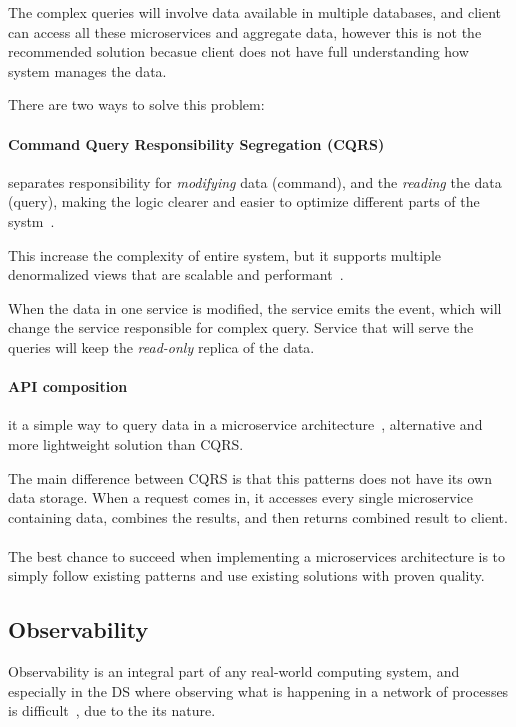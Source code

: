The complex queries will involve data available in multiple databases, and client can access all these microservices and aggregate data, however this is not the recommended solution becasue client does not have full understanding how system manages the data.

There are two ways to solve this problem:
\paragraph{Command Query Responsibility Segregation (CQRS)}\label{par:cqrs}
%
separates responsibility for \emph{modifying} data (command), and the \emph{reading} the data (query), making the logic clearer and easier to optimize different parts of the systm~\cite{richardson2018microservices, 8101372}.

This increase the complexity of entire system, but it supports multiple denormalized views that are scalable and performant~\cite{richardson2018microservices}.

When the data in one service is modified, the service emits the event, which will change the service responsible for complex query. Service that will serve the queries will keep the \emph{read-only} replica of the data.
%
%
\paragraph{API composition}\label{par:composition}
%
%
it a simple way to query data in a microservice architecture~\cite{richardson2018microservices, 8890660}, alternative and more lightweight solution than CQRS. 

The main difference between CQRS is that this patterns does not have its own data storage. When a request comes in, it accesses every single microservice containing data, combines the results, and then returns combined result to client.\\\\
%
The best chance to succeed when implementing a microservices architecture is to simply follow existing patterns and use existing solutions with proven quality.
%
%
\subsection{Observability}\label{sec:log_aggregation}
%
Observability is an integral part of any real-world computing system, and especially in the DS where observing what is happening in a network of processes is difficult~\cite{Fidge96}, due to the its nature.

